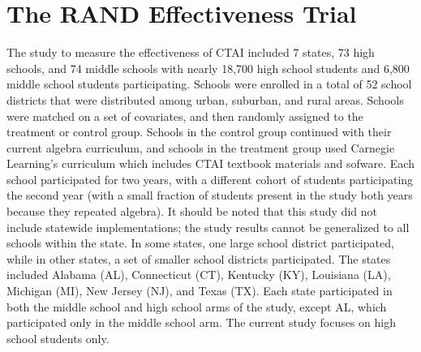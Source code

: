\documentclass[notitlepage,12pt]{jedm}\usepackage[]{graphicx}\usepackage[]{color}
\begin{document}
\section{The RAND Effectiveness Trial}\label{sec:RANDtrial}
The study to measure the effectiveness of CTAI included 7 states, 73
high schools, and 74 middle schools with nearly 18,700 high school
students and 6,800 middle school students participating. Schools were enrolled in a
total of 52 school districts that were distributed among urban,
suburban, and rural areas. Schools were matched on a set of
covariates, and then randomly assigned to the treatment or control
group. Schools in the control group continued with their current
algebra curriculum, and schools in the treatment group used Carnegie
Learning's curriculum which includes CTAI textbook materials and sofware. Each school participated for two years, with a different cohort
of students participating the second year (with a small fraction of
students present in the study both years because they repeated
algebra). It should be noted that this study did not include statewide
implementations; the study results cannot be generalized to all
schools within the state. In some states, one large school district
participated, while in other states, a set of smaller school districts
participated. The states included Alabama (AL), Connecticut (CT),
Kentucky (KY), Louisiana (LA), Michigan (MI), New Jersey (NJ), and
Texas (TX). Each state participated in both the middle school and high
school arms of the study, except AL, which participated only in the
middle school arm. The current study focuses on high school students
only.
\end{document}
